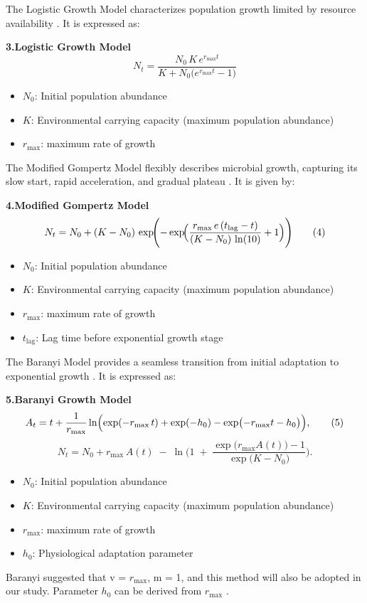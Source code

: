 \documentclass{article}
\begin{document}
The Logistic Growth Model characterizes population growth limited by resource availability \citep{Tsoularis2002}. It is expressed as:

\noindent \textbf{3.\;Logistic Growth Model}
\[
N_t = \frac{N_0 \, K \, e^{r_{\max} t}}{K + N_0 \bigl(e^{r_{\max} t} - 1\bigr)} \tag{3}
\]
\begin{itemize}
  \item $N_0$: Initial population abundance
  \item $K$: Environmental carrying capacity (maximum population abundance)
  \item $r_{\max}$: maximum rate of growth
\end{itemize}


The Modified Gompertz Model flexibly describes microbial growth, capturing its slow start, rapid acceleration, and gradual plateau \citep{Maria2006}. It is given by:

\noindent \textbf{4.\;Modified Gompertz Model}
\[
N_t = N_0 + (K - N_0)\,
\exp\!\Biggl(-\exp\!\Bigl(\frac{r_{\max} \, e \,(t_{\mathrm{lag}} - t)}  
{(K - N_0)\,\ln(10)} + 1\Bigr)\Biggr)  \tag{4}
\]
\begin{itemize}
  \item $N_0$: Initial population abundance
  \item $K$: Environmental carrying capacity (maximum population abundance)
  \item $r_{\max}$: maximum rate of growth
  \item $t_{\mathrm{lag}}$: Lag time before exponential growth stage
\end{itemize}

The Baranyi Model provides a seamless transition from initial adaptation to exponential growth \citep{Grijspeerdt1999}. It is expressed as:

\noindent \textbf{5.\;Baranyi Growth Model}
\[
A_t = t + \frac{1}{r_{\max}} \ln\Bigl(\exp(-r_{\max} \, t) 
+ \exp(-h_0) - \exp\bigl(-r_{\max}t - h_0\bigr)\Bigr), \tag{5}
\]
\[
N_t = N_0 + r_{\max}\,A(t)\;-\;\ln\!\Biggl(1 
\;+\;\frac{\exp\bigl(r_{\max}A(t)\bigr) - 1}{\exp\bigl(K - N_0\bigr)}\Biggr). \tag{6}
\]
\begin{itemize}
  \item $N_0$: Initial population abundance
  \item $K$: Environmental carrying capacity (maximum population abundance)
  \item $r_{\max}$: maximum rate of growth
  \item $h_0$: Physiological adaptation parameter


\end{itemize}
Baranyi suggested that v = $r_{\max}$, m = 1, and this method will also be adopted in our study. Parameter $h_0$ can be derived from $r_{\max}$ \citep{József1994}.
\end{document}
